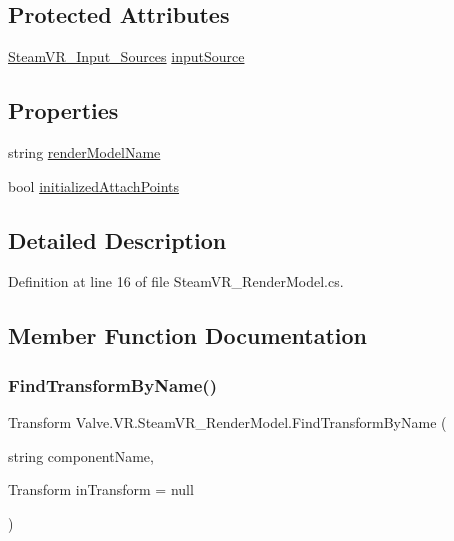 \subsection*{Protected Attributes}
\begin{DoxyCompactItemize}
\item 
\mbox{\hyperlink{namespace_valve_1_1_v_r_a82e5bf501cc3aa155444ee3f0662853f}{Steam\+V\+R\+\_\+\+Input\+\_\+\+Sources}} \mbox{\hyperlink{class_valve_1_1_v_r_1_1_steam_v_r___render_model_a97f12235b76af906c2d2cd83dce06785}{input\+Source}}
\end{DoxyCompactItemize}
\subsection*{Properties}
\begin{DoxyCompactItemize}
\item 
string \mbox{\hyperlink{class_valve_1_1_v_r_1_1_steam_v_r___render_model_a0655bfb7f8ed5cfb849c2156737dab6a}{render\+Model\+Name}}
\item 
bool \mbox{\hyperlink{class_valve_1_1_v_r_1_1_steam_v_r___render_model_a5950c36ccece814211ef458311b3f71f}{initialized\+Attach\+Points}}
\end{DoxyCompactItemize}


\subsection{Detailed Description}


Definition at line 16 of file Steam\+V\+R\+\_\+\+Render\+Model.\+cs.



\subsection{Member Function Documentation}
\mbox{\label{class_valve_1_1_v_r_1_1_steam_v_r___render_model_a5d384d5496846ec32181563e7d5ff7ce}} 
\subsubsection{\texorpdfstring{FindTransformByName()}{FindTransformByName()}}
{\footnotesize\ttfamily Transform Valve.\+V\+R.\+Steam\+V\+R\+\_\+\+Render\+Model.\+Find\+Transform\+By\+Name (\begin{DoxyParamCaption}\item[{string}]{component\+Name,  }\item[{Transform}]{in\+Transform = {\ttfamily null} }\end{DoxyParamCaption})}




